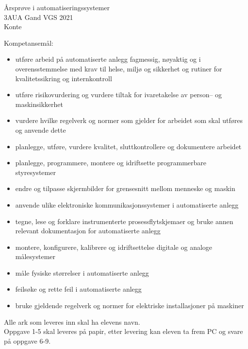 
\Huge Årsprøve i automatiseringssystemer\\ 3AUA Gand VGS 2021\\Konte

\normalsize

\vskip 10pt 
Kompetansemål:
\begin{itemize}[noitemsep]
\item utføre arbeid på automatiserte anlegg fagmessig, nøyaktig og i overensstemmelse med krav til helse, miljø og sikkerhet og rutiner for kvalitetssikring og internkontroll
\item utføre risikovurdering og vurdere tiltak for ivaretakelse av person– og maskinsikkerhet
\item vurdere hvilke regelverk og normer som gjelder for arbeidet som skal utføres og anvende dette
\item planlegge, utføre, vurdere kvalitet, sluttkontrollere og dokumentere arbeidet
\item planlegge, programmere, montere og idriftsette programmerbare styresystemer
\item endre og tilpasse skjermbilder for grensesnitt mellom menneske og maskin
\item anvende ulike elektroniske kommunikasjonssystemer i automatiserte anlegg
\item tegne, lese og forklare instrumenterte prosessflytskjemaer og bruke annen relevant dokumentasjon for automatiserte anlegg
\item montere, konfigurere, kalibrere og idriftsettelse digitale og analoge målesystemer
\item måle fysiske størrelser i automatiserte anlegg
\item feilsøke og rette feil i automatiserte anlegg
\item bruke gjeldende regelverk og normer for elektriske installasjoner på maskiner
\end{itemize}

Alle ark som leveres inn skal ha elevens navn. \\ 

Oppgave 1-5 skal leveres på papir, etter levering kan eleven ta frem PC og svare på oppgave 6-9.\\

\vskip 2.5pt 

